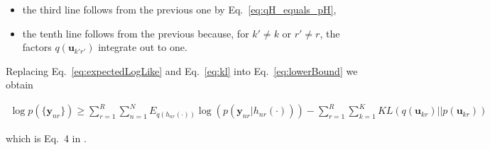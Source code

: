 \documentclass[12pt]{article}
\begin{document}
\begin{itemize}

    \item the third line follows from the previous one by Eq.~\ref{eq:qH_equals_pH},

    \item the tenth line follows from the previous because, for $k'\neq k$ or
        $r'\neq r$, the factors $q(\mathbf{u}_{k'r'})$ integrate out to one.

\end{itemize}

Replacing Eq.~\ref{eq:expectedLogLike} and Eq.~\ref{eq:kl} into Eq.~\ref{eq:lowerBound} we obtain

\begin{align}
    \log p(\{\mathbf{y}_{nr}\})\ge \sum_{r=1}^R\sum_{n=1}^NE_{q(h_{nr}(\cdot))}\log\left(p(\mathbf{y}_{nr}|h_{nr}(\cdot))\right)-\sum_{r=1}^R\sum_{k=1}^K KL(q(\mathbf{u}_{kr})||p(\mathbf{u}_{kr}))
    \label{eq:lowerBoundFinal}
\end{align}

\noindent which is Eq.~4 in \cite{dunckerAndSahani18}.



\end{document}
